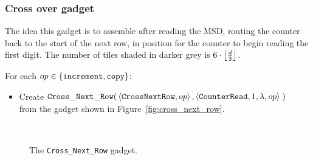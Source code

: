 
\subsubsection{Cross over gadget}

The idea this gadget is to assemble after reading the MSD, routing the counter back to the start of the
next row, in position for the counter to begin reading the first digit.
The number of tiles shaded in darker grey is $6 \cdot \floor*{\frac{d}{3}}$.

\vspace{.5cm}
For each $\inc\in \{ {\tt increment}, {\tt copy} \}$:

\begin{itemize}
    \item Create
    $\begin{aligned}[t]
        {\tt Cross\_Next\_Row}(&\left\langle {\tt CrossNextRow},            \inc \right\rangle,
                                \left\langle {\tt CounterRead},        1, \lambda, \inc \right\rangle \;)
    \end{aligned}$\\from the gadget shown in Figure~\ref{fig:cross_next_row}.
\end{itemize}


\begin{figure}[H]
    \centering
    {}%
    ~
    {}%
    ~
    \caption{\label{fig:crosser_gadgets} The {\tt Cross\_Next\_Row} gadget.}
\end{figure}

